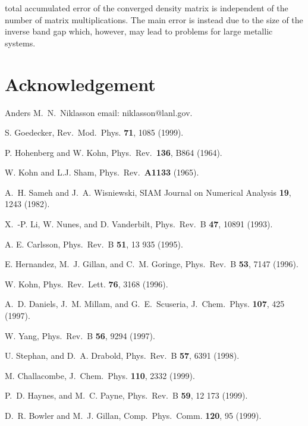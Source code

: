 \commentoutA{\documentclass[prb,aps,twocolumn,twocolumngrid,secnumarabic,superbib,hyperref]{revtex4}}
\begin{document}
{total accumulated error of the converged density matrix is independent
of the number of matrix multiplications. The main error 
is instead due to the size of the inverse band gap which, however,
may lead to problems for large metallic systems.

\section{Acknowledgement}






\begin{references}

 Anders M.\ N.\ Niklasson email: niklasson@lanl.gov.

 S. Goedecker,
Rev.\ Mod.\ Phys. {\bf 71}, 1085 (1999).

 P. Hohenberg and W. Kohn,
Phys.\ Rev.\ {\bf 136}, B864 (1964).

 W. Kohn and L.J. Sham,
Phys.\ Rev.\ {\bf A1133} (1965).

  A.\ H. Sameh and J.\ A. Wisniewski,
SIAM Journal on Numerical Analysis {\bf 19}, 1243 (1982).

 X.\ -P. Li, W. Nunes, and D. Vanderbilt,
Phys.\ Rev.\ B {\bf 47}, 10891 (1993).

 A. E. Carlsson,
Phys.\ Rev.\ B {\bf 51}, 13 935 (1995).

 E. Hernandez, M.\ J. Gillan, and C.\ M. Goringe,
Phys.\ Rev.\ B {\bf 53}, 7147 (1996).

 W. Kohn,
Phys.\ Rev.\ Lett. {\bf 76}, 3168 (1996).

 A.\ D. Daniels, J.\ M. Millam, and G.\ E.\ Scuseria,
J.\ Chem.\ Phys. {\bf 107}, 425 (1997).

 W. Yang,
Phys.\ Rev.\ B {\bf 56}, 9294 (1997).

 U. Stephan, and D.\ A. Drabold,
Phys.\ Rev.\ B {\bf 57}, 6391 (1998).

 M. Challacombe,
J.\ Chem.\ Phys. {\bf 110}, 2332 (1999).

 P.\ D. Haynes, and M.\ C. Payne,
Phys.\ Rev.\ B {\bf 59}, 12 173 (1999).

 D.\ R. Bowler and M.\ J. Gillan,
Comp.\ Phys.\ Comm. {\bf 120}, 95 (1999).


\end{references}}
\end{document}
